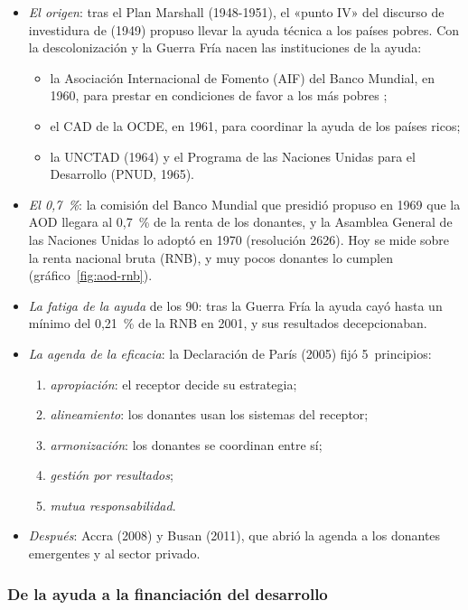 \documentclass[11pt]{article}
\begin{document}
\begin{itemize}
\item \emph{El origen}: tras el Plan Marshall (1948-1951), el «punto IV» del discurso de investidura de  (1949) propuso llevar la ayuda técnica a los países pobres. Con la descolonización y la Guerra Fría nacen las instituciones de la ayuda:
  \begin{itemize}
  \item la Asociación Internacional de Fomento (AIF) del Banco Mundial, en 1960, para prestar en condiciones de favor a los más pobres ;
  \item el CAD de la OCDE, en 1961, para coordinar la ayuda de los países ricos;
  \item la UNCTAD (1964) y el Programa de las Naciones Unidas para el Desarrollo (PNUD, 1965).
  \end{itemize}
\item \emph{El 0,7~\%}: la comisión del Banco Mundial que presidió  propuso en 1969 que la AOD llegara al 0,7~\% de la renta de los donantes, y la Asamblea General de las Naciones Unidas lo adoptó en 1970 (resolución 2626)\nocite{OCDE2026Meta07}. Hoy se mide sobre la renta nacional bruta (RNB), y muy pocos donantes lo cumplen (gráfico~\ref{fig:aod-rnb}).
\item \emph{La fatiga de la ayuda} de los 90: tras la Guerra Fría la ayuda cayó hasta un mínimo del 0,21~\% de la RNB en 2001\nocite{OCDE2026DAC1}, y sus resultados decepcionaban.
\item \emph{La agenda de la eficacia}: la Declaración de París (2005) fijó 5~principios\nocite{OCDE2005Paris}:
  \begin{enumerate}
  \item \emph{apropiación}: el receptor decide su estrategia;
  \item \emph{alineamiento}: los donantes usan los sistemas del receptor;
  \item \emph{armonización}: los donantes se coordinan entre sí;
  \item \emph{gestión por resultados};
  \item \emph{mutua responsabilidad}.
  \end{enumerate}
\item \emph{Después}: Accra (2008) y Busan (2011), que abrió la agenda a los donantes emergentes y al sector privado.
\end{itemize}

\subsubsection{De la ayuda a la financiación del desarrollo}\label{sec:ffd}
\end{document}
